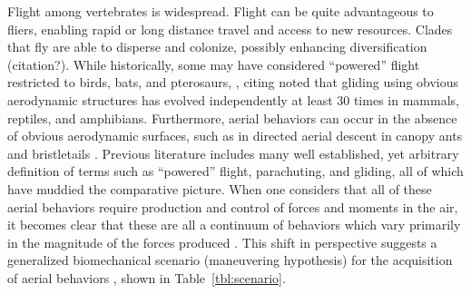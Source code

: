 Flight among vertebrates is widespread.  Flight can be quite advantageous to fliers, enabling rapid or long distance travel and access to new resources.  Clades that fly are able to disperse and colonize, possibly enhancing diversification (citation?).  While historically, some may have considered ``powered'' flight restricted to birds, bats, and pterosaurs, \citet{Dudley:2011}, citing \citep{Rayner:1988, Norberg:1990} noted that gliding using obvious aerodynamic structures has evolved independently at least 30 times in mammals, reptiles, and amphibians.  Furthermore, aerial behaviors can occur in the absence of obvious aerodynamic surfaces, such as in directed aerial descent in canopy ants \citep{Yanoviak:2005, Yanoviak:2011} and bristletails \citep{Yanoviak:2008}.  Previous literature includes many well established, yet arbitrary definition of terms such as ``powered'' flight, parachuting, and gliding, all of which have muddied the comparative picture.  When one considers that all of these aerial behaviors require production and control of forces and moments in the air, it becomes clear that these are all a continuum of behaviors which vary primarily in the magnitude of the forces produced \citep{Dudley:2011}.  This shift in perspective suggests a generalized biomechanical scenario (maneuvering hypothesis) for the acquisition of aerial behaviors \citep{Dudley:2011}, shown in Table~\ref{tbl:scenario}.   
\begin{table}
\caption{Generalized biomechanical scenario for the acquisition of aerial behaviors and flight, repeated from \citep{Dudley:2011}}
\label{tbl:scenario}
\begin{center}

\end{center}
\end{table}

